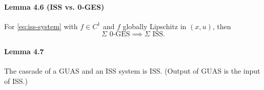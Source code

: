 \paragraph{Lemma 4.6 (ISS vs. 0-GES)}
For \eqref{eq:iss-system} with $f \in C^1$ and $f$ globally Lipschitz in $(x,u)$, then
\begin{equation}
	\Sigma \mbox{ 0-GES} \implies \Sigma \mbox{ ISS}
	.
\end{equation}

\paragraph{Lemma 4.7}
The cascade of a GUAS and an ISS system is ISS. (Output of GUAS is the input of ISS.)
